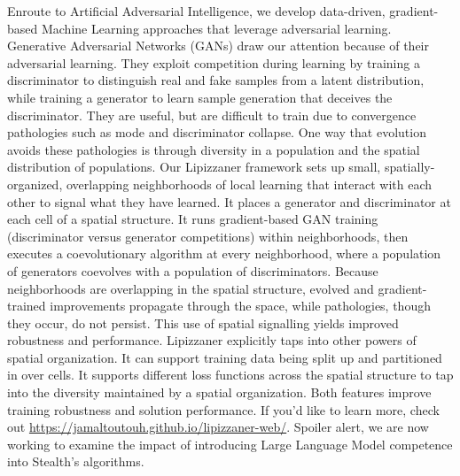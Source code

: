 \documentclass[12pt,bibliography=numbered]{article}
\begin{document}
\label{Lipizzaner}
Enroute to Artificial Adversarial Intelligence, we  develop data-driven, gradient-based Machine Learning approaches that leverage adversarial learning. Generative Adversarial Networks (GANs) draw our attention because of their adversarial learning.  They exploit competition during learning by training a discriminator to distinguish real and fake samples from a latent distribution, while training a generator to learn sample generation that deceives the discriminator. They are useful, but are difficult to train due to convergence pathologies such as mode and discriminator collapse. One way that evolution avoids these pathologies is through diversity in a population and the spatial distribution of populations. Our Lipizzaner framework sets up small, spatially-organized, overlapping neighborhoods of local learning that interact with each other to signal what they have learned. It places a generator and discriminator at each cell of a spatial structure. It runs  gradient-based GAN training (discriminator versus generator competitions) within neighborhoods, then executes a coevolutionary algorithm at every neighborhood, where a population of generators coevolves  with a population of discriminators. Because  neighborhoods are overlapping in the spatial structure, evolved and gradient-trained improvements propagate through the space, while pathologies, though they occur, do not persist. This use of spatial signalling yields  improved robustness and performance. Lipizzaner explicitly taps into other powers of spatial organization. It can support  training data being split up and partitioned in over cells. It supports different  loss functions across the spatial structure to tap into the diversity maintained by a spatial organization. Both features improve training robustness and solution performance.
\label{shorter Lipizzaner}
If you'd like to learn more, check out \url{https://jamaltoutouh.github.io/lipizzaner-web/}.  Spoiler alert, we are now working to examine the impact of introducing Large Language Model competence into Stealth's algorithms.
\end{document}
